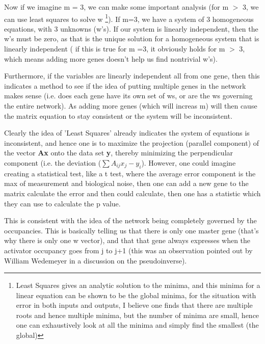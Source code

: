 Now if we imagine m = 3, we can make some important analysis (for m $>$ 3, we can use least squares to solve  w \footnote[1]{ Least Squares gives an analytic solution to the minima, and this minima for a linear equation can be shown to be the global minima, for the situation with error in both inputs and outputs, I believe one finds that there are multiple roots and hence multiple minima, but the number of minima are small, hence one can exhaustively look at all the minima and simply find the smallest (the global)}).  If m=3, we have a system of 3 homogeneous equations, with 3 unknowns (w's).  If our system is linearly independent, then the w's must be zero, as that is the unique solution for a homogeneous system that is linearly independent ( if this is true for m =3, it obviously holds for m $>$ 3, which means adding more genes doesn't help us find nontrivial w's).  \\
\par
Furthermore, if the variables are linearly independent all from one gene, then this indicates a method to see if the idea of putting multiple genes in the network makes sense (i.e. does each gene have its own set of ws, or are the ws governing the entire network).  As adding more genes (which will increas m) will then cause the matrix equation to stay consistent or the system will be inconsistent.  \\
\par
Clearly the idea of 'Least Squares' already indicates the system of equations is inconsistent, and hence one is to maximize the projection (parallel component) of the vector \textbf{Ax} onto the data set \textbf{y}, thereby minimizing the perpendicular component (i.e. the deviation ($\sum A_{ij} x_j - y_i$).  However, one could imagine creating a statistical test, like a t test, where the average error component is the max of measurement and biological noise, then one can add a new gene to the matrix calculate the error and then could calculate, then one has a statistic which they can use to calculate the p value.\\
\par
This is consistent with the idea of the network being completely governed by the occupancies.  This is basically telling us that there is only one master gene (that's why there is only one w vector), and that that gene always expresses when the activator occupancy goes from j to j+1 (this was an observation pointed out by William Wedemeyer in a discussion on the pseudoinverse).
\par
